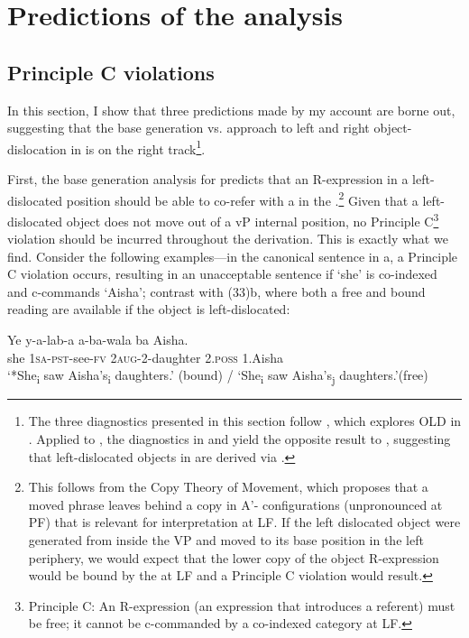 \documentclass[output=paper
,newtxmath
,modfonts
,nonflat]{langsci/langscibook}
\begin{document}
\section{Predictions of the analysis}\label{sec:ranero:5}
\subsection{Principle C violations}\label{sec:ranero:5.1}

\textup{In this section, I show that three predictions made by my account are borne out, suggesting that the base generation vs.  approach to left and right object-dislocation in  is on the right track}\footnote{The three diagnostics presented in this section follow \citet{zeller2009}, which explores OLD in . Applied to , the diagnostics in  and  yield the opposite result to , suggesting that left-dislocated objects in  are derived via .}. 



\textup{First, the base generation analysis for  predicts that an R-expression in a left-dislocated position should be able to co-refer with a  in the .}\footnote{This follows from the Copy Theory of Movement, which proposes that a moved phrase leaves behind a copy in A’- configurations (unpronounced at PF) that is relevant for interpretation at LF. If the left dislocated object were generated from inside the VP and moved to its base position in the left periphery, we would expect that the lower copy of the object R-expression would be bound by the  at LF and a Principle C violation would result.} \textup{Given that a left-dislocated object does not move out of a} v\textup{P internal position, no Principle C}\footnote{Principle C: An R-expression (an expression that introduces a referent) must be free; it cannot be c-commanded by a co-indexed category at LF.} \textup{violation should be incurred throughout the derivation. This is exactly what we find. Consider the following examples—in the canonical sentence in a, a Principle C violation occurs, resulting in an unacceptable sentence if ‘she’ is co-indexed and c-commands ‘Aisha’; contrast with (33)b, where both a free and bound reading are available if the object is left-dislocated:}


\ea\label{ex:ranero:33}
\ea\label{ex:ranero:33a}
\gll Ye  y-a-lab-a           a-ba-wala      ba        Aisha.\\
she \textsc{1sa-pst}{}-see\textsc{{}-fv} 2\textsc{aug}{}-2-daughter 2.\textsc{poss} 1.Aisha\\
\glt ‘*She\textsubscript{i} saw Aisha’s\textsubscript{i} daughters.’ (bound) / ‘She\textsubscript{i} saw Aisha’s\textsubscript{j} daughters.’(free)
\end{document}
